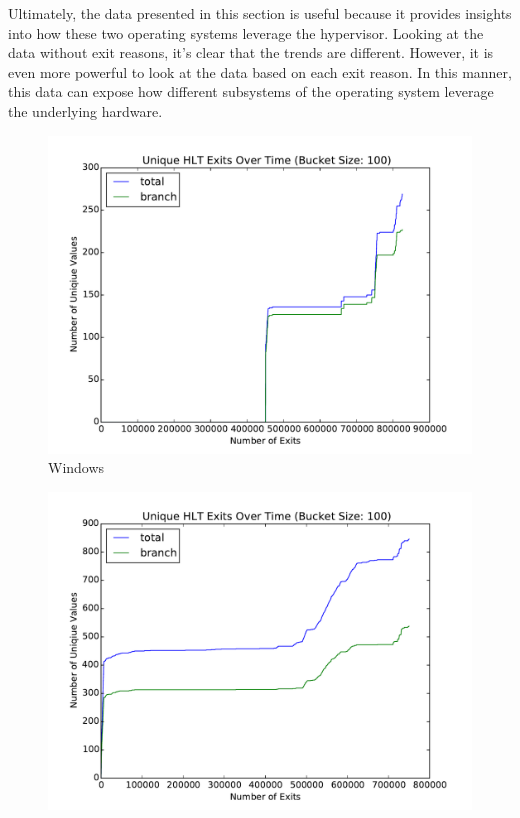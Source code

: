 \documentclass[notitlepage]{article}
\begin{document}
Ultimately, the data presented in this section is useful because it provides
insights into how these two operating systems leverage the hypervisor. Looking
at the data without exit reasons, it's clear that the trends are different.
However, it is even more powerful to look at the data based on each exit reason.
In this manner, this data can expose how different subsystems of the operating
system leverage the underlying hardware.

\begin{figure}[htpb!]
    \centering
    \begin{minipage}{.5\textwidth}
        \centering
        \includegraphics[width=1\textwidth]{hlt_windows.pdf}
        Windows
    \end{minipage}%
    \begin{minipage}{0.5\textwidth}
        \centering
        \includegraphics[width=1\textwidth]{hlt_linux.pdf}

\end{minipage}
\end{figure}
\end{document}
